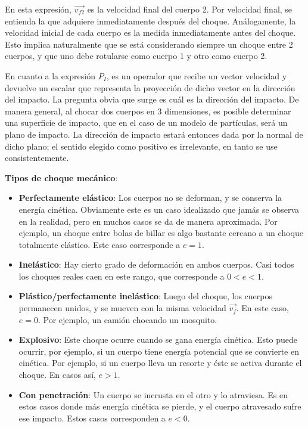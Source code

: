 \documentclass{article}
\begin{document}
En esta expresión, $\overrightarrow{v_{f2}}$ es la velocidad final del cuerpo 2. Por velocidad final, se entienda la que adquiere inmediatamente después del choque. Análogamente, la velocidad inicial de cada cuerpo es la medida inmediatamente antes del choque. Esto implica naturalmente que se está considerando siempre un choque entre 2 cuerpos, y que uno debe rotularse como cuerpo 1 y otro como cuerpo 2.

En cuanto a la expresión $P_I$, es un operador que recibe un vector velocidad y devuelve un escalar que representa la proyección de dicho vector en la dirección del impacto. La pregunta obvia que surge es cuál es la dirección del impacto. De manera general, al chocar dos cuerpos en 3 dimensiones, es posible determinar una superficie de impacto, que en el caso de un modelo de partículas, será un plano de impacto. La dirección de impacto estará entonces dada por la normal de dicho plano; el sentido elegido como positivo es irrelevante, en tanto se use consistentemente.

\textbf{Tipos de choque mecánico}:

\begin{itemize}
\item \textbf{Perfectamente elástico}: Los cuerpos no se deforman, y se conserva la energía cinética. Obviamente este es un caso idealizado que jamás se observa en la realidad, pero en muchos casos se da de manera aproximada. Por ejemplo, un choque entre bolas de billar es algo bastante cercano a un choque totalmente elástico. Este caso corresponde a $e = 1$.
\item \textbf{Inelástico}: Hay cierto grado de deformación en ambos cuerpos. Casi todos los choques reales caen en este rango, que corresponde a $0 < e < 1$.
\item \textbf{Plástico/perfectamente inelástico}: Luego del choque, los cuerpos permanecen unidos, y se mueven con la misma velocidad $\overrightarrow{v_f}$. En este caso, $e = 0$. Por ejemplo, un camión chocando un mosquito.
\item \textbf{Explosivo}: Este choque ocurre cuando se gana energía cinética. Esto puede ocurrir, por ejemplo, si un cuerpo tiene energía potencial que se convierte en cinética. Por ejemplo, si un cuerpo lleva un resorte y éste se activa durante el choque. En casos así, $e > 1$.
\item \textbf{Con penetración}: Un cuerpo se incrusta en el otro y lo atraviesa. Es en estos casos donde más energía cinética se pierde, y el cuerpo atravesado sufre ese impacto. Estos casos corresponden a $e < 0$.
\end{itemize}
\end{document}
